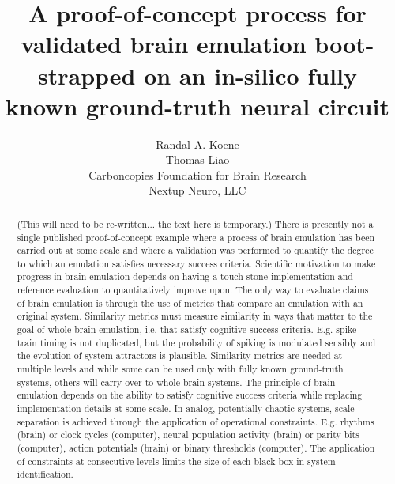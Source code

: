 \documentclass{ldr-article}
\title{A proof-of-concept process for validated brain emulation boot-strapped on an in-silico fully known ground-truth neural circuit}
\author{
Randal A. Koene\\
Thomas Liao\\
Carboncopies Foundation for Brain Research\\
Nextup Neuro, LLC
}
\begin{document}
    \maketitle

    \begin{abstract}
       (This will need to be re-written... the text here is temporary.)
       There is presently not a single published proof-of-concept example where a process of brain emulation has been carried out at some scale and where a validation was performed to quantify the degree to which an emulation satisfies necessary success criteria. Scientific motivation to make progress in brain emulation depends on having a touch-stone implementation and reference evaluation to quantitatively improve upon. The only way to evaluate claims of brain emulation is through the use of metrics that compare an emulation with an original system. Similarity metrics must measure similarity in ways that matter to the goal of whole brain emulation, i.e. that satisfy cognitive success criteria. E.g. spike train timing is not duplicated, but the probability of spiking is modulated sensibly and the evolution of system attractors is plausible. Similarity metrics are needed at multiple levels and while some can be used only with fully known ground-truth systems, others will carry over to whole brain systems. The principle of brain emulation depends on the ability to satisfy cognitive success criteria while replacing implementation details at some scale. In analog, potentially chaotic systems, scale separation is achieved through the application of operational constraints. E.g. rhythms (brain) or clock cycles (computer), neural population activity (brain) or parity bits (computer), action potentials (brain) or binary thresholds (computer). The application of constraints at consecutive levels limits the size of each black box in system identification.
    \end{abstract}
    
\end{document}
